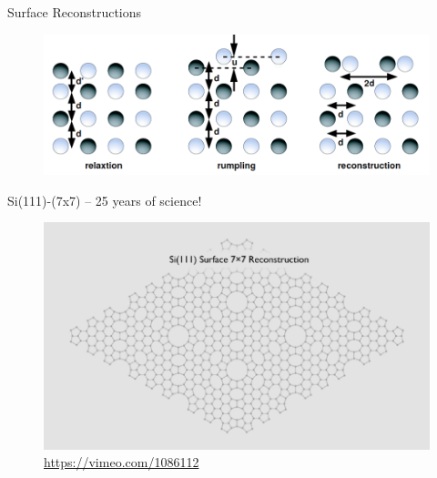 \documentclass[aspectratio=169]{beamer}
\begin{document}
    \begin{frame}{Surface Reconstructions}
        \begin{figure}
            \centering
            \includegraphics[width=0.9\linewidth]{lectures/figures/11_reconstructions.png}
        \end{figure}
    \end{frame}

    \begin{frame}{Si(111)-(7x7) – 25 years of science!}
        \begin{figure}
            \centering
            \includegraphics[width=0.7\linewidth]{lectures/figures/11_Si111.png}
            \caption{\url{https://vimeo.com/1086112}}
        \end{figure}
    \end{frame}
\end{document}
